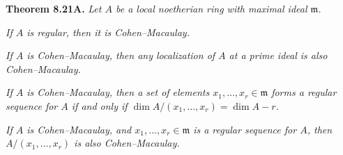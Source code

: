 {\medskip
\noindent\hypertarget{result-II-8.21A}{}\textbf{Theorem 8.21A.} \emph{Let $A$ be a local noetherian ring with maximal ideal $\mathfrak m$.}
\begin{parts}
\item\hypertarget{result-II-8.21Aa}{} \emph{If $A$ is regular, then it is Cohen--Macaulay.}
\item\hypertarget{result-II-8.21Ab}{} \emph{If $A$ is Cohen--Macaulay, then any localization of $A$ at a prime ideal is also Cohen--Macaulay.}
\item\hypertarget{result-II-8.21Ac}{} \emph{If $A$ is Cohen--Macaulay, then a set of elements $x_1,\ldots,x_r\in\mathfrak m$ forms a regular sequence for $A$ if and only if $\dim A/(x_1,\ldots,x_r)=\dim A-r$.}
\item\hypertarget{result-II-8.21Ad}{} \emph{If $A$ is Cohen--Macaulay, and $x_1,\ldots,x_r\in\mathfrak m$ is a regular sequence for $A$, then $A/(x_1,\ldots,x_r)$ is also Cohen--Macaulay.}
\end{parts}
}

